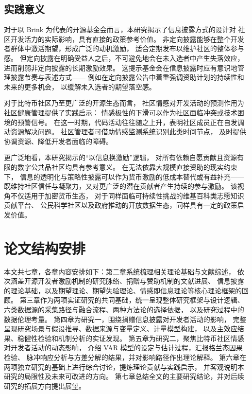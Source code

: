 \subsection{实践意义}

对于以 Brink 为代表的开源基金会而言，本研究揭示了信息披露方式的设计对
社区开发活力的实际影响，具有直接的政策参考价值。
非定向披露能够在整个开发者群体中激活期望，形成广泛的动机激励，
适合定期发布以维护社区的整体参与感。
但定向披露在明确受益人之后，不可避免地会在未入选者中产生失落效应，
进而削弱非定向披露的长期激励效果。
这提示基金会在信息披露时应有意识地管理披露节奏与表述方式——
例如在定向披露公告中着重强调资助计划的持续性和未来的更多机会，
以缓解未入选者的期望落空感。

对于比特币社区乃至更广泛的开源生态而言，
社区情感对开发活动的预测作用为社区健康管理提供了实践启示：
情感极性的下滑可以作为社区面临冲突或技术困境的预警信号。
在这一时期，代码活动往往随之上升，表明社区成员正在自发调动资源解决问题。
社区管理者可借助情感监测系统识别此类时间节点，
及时提供协调资源、降低开发者面临的障碍。

更广泛地看，本研究揭示的“以信息换激励”逻辑，
对所有依赖自愿贡献且资源有限的数字公共品社区均具有参考意义。
在无法依靠大规模直接资助的现实约束下，
信息的透明化与策略性披露可以作为货币激励的低成本替代或有益补充——
既维持社区信任与凝聚力，又对更广泛的潜在贡献者产生持续的参与激励。
该视角不仅适用于加密货币生态，
对于同样面临可持续性挑战的维基百科类志愿知识贡献平台、
公民科学社区以及政府推动的开放数据生态，同样具有一定的政策启发价值。

\section{论文结构安排}

本文共七章，各章内容安排如下：第二章系统梳理相关理论基础与文献综述，
依次涵盖开源开发者激励机制的研究脉络、捐赠与赞助机制的文献进展、
信息披露的理论基础，以及期望理论、期望失验理论、情感即信息理论等核心理论框架的回顾。
第三章作为两项实证研究的共同基础，统一呈现整体研究框架与设计逻辑、
六类数据源的采集路径与融合流程、两种方法论的选择依据，
以及研究过程中的数据伦理考量。
第四章为研究一，围绕捐赠信息披露对开发者活动的影响，
完整呈现研究场景与假设推导、数据来源与变量定义、计量模型构建，
以及主效应结果、稳健性检验和机制分析的实证发现。
第五章为研究二，聚焦比特币社区情感对开发者活动的动态影响，
介绍 VAR 模型的设定与估计过程，汇报格兰杰因果检验、
脉冲响应分析与方差分解的结果，并对影响路径作出理论解释。
第六章在两项独立研究的基础上进行综合讨论，提炼理论贡献与实践启示，
并客观说明本研究的局限性及未来可改进的方向。
第七章总结全文的主要研究结论，并对后续研究的拓展方向提出展望。